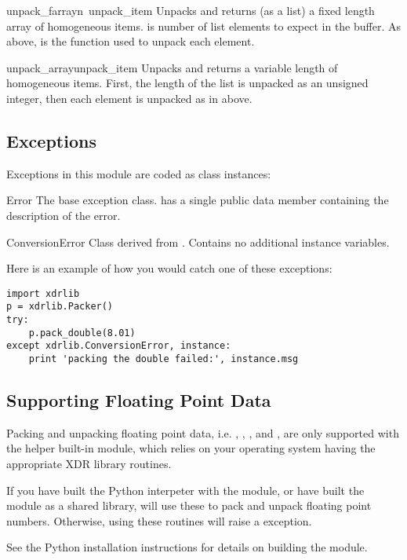\begin{funcdesc}{unpack_farray}{n\, unpack_item}
Unpacks and returns (as a list) a fixed length array of homogeneous
items.   is number of list elements to expect in the buffer.
As above,  is the function used to unpack each element.
\end{funcdesc}

\begin{funcdesc}{unpack_array}{unpack_item}
Unpacks and returns a variable length  of homogeneous items.
First, the length of the list is unpacked as an unsigned integer, then
each element is unpacked as in  above.
\end{funcdesc}

\subsection{Exceptions}

Exceptions in this module are coded as class instances:

\begin{excdesc}{Error}
The base exception class.   has a single public data
member  containing the description of the error.
\end{excdesc}

\begin{excdesc}{ConversionError}
Class derived from .  Contains no additional instance
variables.
\end{excdesc}

Here is an example of how you would catch one of these exceptions:

\begin{verbatim}
import xdrlib
p = xdrlib.Packer()
try:
    p.pack_double(8.01)
except xdrlib.ConversionError, instance:
    print 'packing the double failed:', instance.msg
\end{verbatim}

\subsection{Supporting Floating Point Data}

Packing and unpacking floating point data,
i.e. , ,
, and , are
only supported with the helper built-in  module, which
relies on your operating system having the appropriate XDR library
routines.

If you have built the Python interpeter with the  module,
or have built the  module as a shared library,
 will use these to pack and unpack floating point
numbers.  Otherwise, using these routines will raise a
 exception.

See the Python installation instructions for details on building the
 module.
